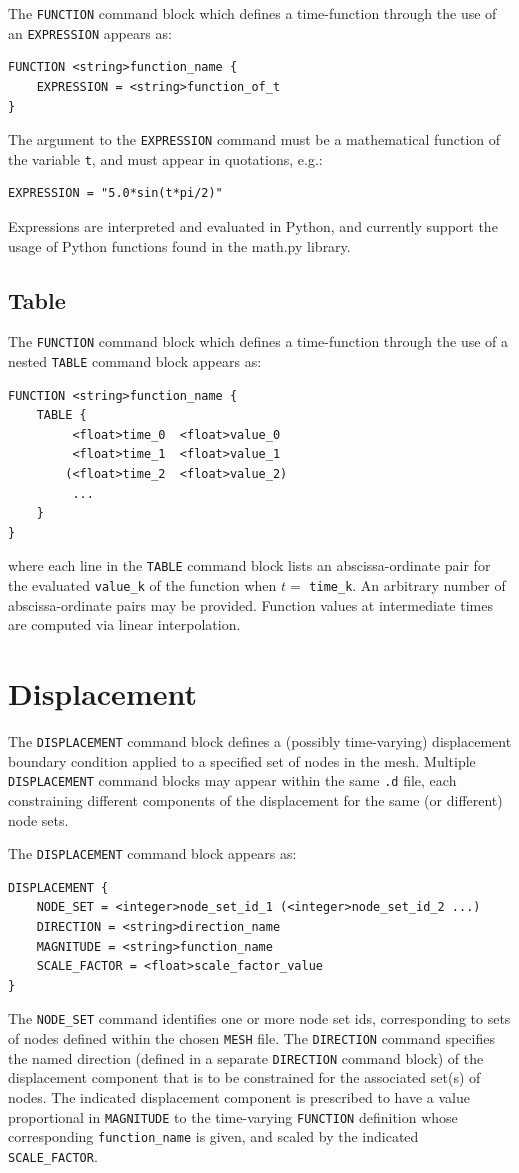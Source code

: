\documentclass[11pt]{article} %
\begin{document}
The \texttt{FUNCTION} command block which defines a time-function through the use of an \texttt{EXPRESSION} appears as:
\begin{lstlisting}
FUNCTION <string>function_name {
	EXPRESSION = <string>function_of_t
}
\end{lstlisting}
The argument to the \texttt{EXPRESSION} command must be a mathematical function of the variable \texttt{t}, and must appear in quotations, e.g.:
\begin{lstlisting}
EXPRESSION = "5.0*sin(t*pi/2)"
\end{lstlisting}
Expressions are interpreted and evaluated in Python, and currently support the usage of Python functions found in the math.py library.
\subsection{Table}

The \texttt{FUNCTION} command block which defines a time-function through the use of a nested \texttt{TABLE} command block appears as:
\begin{lstlisting}
FUNCTION <string>function_name {
	TABLE {
		 <float>time_0	<float>value_0
		 <float>time_1	<float>value_1
		(<float>time_2	<float>value_2)
		 ...
	}
}
\end{lstlisting}
where each line in the \texttt{TABLE} command block lists an abscissa-ordinate pair for the evaluated \texttt{value\_k} of the function when $t=$ \texttt{time\_k}. An arbitrary number of abscissa-ordinate pairs may be provided. Function values at intermediate times are computed via linear interpolation.

\section{Displacement} \label{displacement_section} The \texttt{DISPLACEMENT} command block defines a (possibly time-varying) displacement boundary condition applied to a specified set of nodes in the mesh. Multiple \texttt{DISPLACEMENT} command blocks may appear within the same \texttt{.d} file, each constraining different components of the displacement for the same (or different) node sets.

The \texttt{DISPLACEMENT} command block appears as:
\begin{lstlisting}
DISPLACEMENT {
	NODE_SET = <integer>node_set_id_1 (<integer>node_set_id_2 ...)
	DIRECTION = <string>direction_name
	MAGNITUDE = <string>function_name
	SCALE_FACTOR = <float>scale_factor_value
}
\end{lstlisting}
The \texttt{NODE\_SET} command identifies one or more node set ids, corresponding to sets of nodes defined within the chosen \texttt{MESH} file. The \texttt{DIRECTION} command specifies the named direction (defined in a separate \texttt{DIRECTION} command block) of the displacement component that is to be constrained for the associated set(s) of nodes. The indicated displacement component is prescribed to have a value proportional in \texttt{MAGNITUDE} to the time-varying \texttt{FUNCTION} definition whose corresponding \texttt{function\_name} is given, and scaled by the indicated \texttt{SCALE\_FACTOR}.
\end{document}
